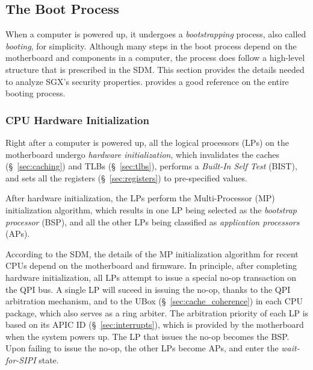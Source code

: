 \subsection{The Boot Process}
\label{sec:booting}

When a computer is powered up, it undergoes a \textit{bootstrapping} process,
also called \textit{booting}, for simplicity. Although many steps in the boot
process depend on the motherboard and components in a computer, the process
does follow a high-level structure that is prescribed in the SDM. This section
provides the details needed to analyze SGX's security properties.
\cite{intel2010booting} provides a good reference on the entire booting
process.

\subsubsection{CPU Hardware Initialization}
\label{sec:cpu_init}


Right after a computer is powered up, all the logical processors (LPs) on the
motherboard undergo \textit{hardware initialization}, which invalidates the
caches (\S~\ref{sec:caching}) and TLBs (\S~\ref{sec:tlbs}), performs a
\textit{Built-In Self Test} (BIST), and sets all the registers
(\S~\ref{sec:registers}) to pre-specified values.


After hardware initialization, the LPs perform the Multi-Processor (MP)
initialization algorithm, which results in one LP being selected as the
\textit{bootstrap processor} (BSP), and all the other LPs being classified as
\textit{application processors} (APs).

According to the SDM, the details of the MP initialization algorithm for recent
CPUs depend on the motherboard and firmware. In principle, after completing
hardware initialization, all LPs attempt to issue a special no-op transaction
on the QPI bus. A single LP will suceed in issuing the no-op, thanks to
the QPI arbitration mechanism, and to the UBox (\S~\ref{sec:cache_coherence})
in each CPU package, which also serves as a ring arbiter. The arbitration
priority of each LP is based on its APIC ID (\S~\ref{sec:interrupts}), which is
provided by the motherboard when the system powers up. The LP that issues the
no-op becomes the BSP. Upon failing to issue the no-op, the other LPs become
APs, and enter the \textit{wait-for-SIPI} state.

